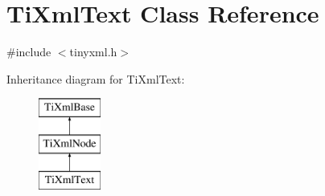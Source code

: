 \hypertarget{classTiXmlText}{\section{\-Ti\-Xml\-Text \-Class \-Reference}
\label{classTiXmlText}
}


{\ttfamily \#include $<$tinyxml.\-h$>$}

\-Inheritance diagram for \-Ti\-Xml\-Text\-:\begin{figure}[H]
\begin{center}
\leavevmode
\includegraphics[height=3.000000cm]{classTiXmlText}
\end{center}
\end{figure}
